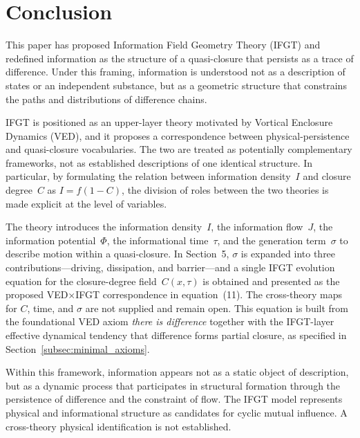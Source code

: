 
\section{Conclusion}
\label{sec:conclusion}

This paper has proposed Information Field Geometry Theory (IFGT) and redefined information as the
structure of a quasi-closure that persists as a trace of difference.
Under this framing, information is understood not as a description of states or an independent
substance, but as a geometric structure that constrains the paths and distributions of difference
chains.

IFGT is positioned as an upper-layer theory motivated by Vortical Enclosure
Dynamics (VED), and it proposes a correspondence between physical-persistence
and quasi-closure vocabularies.  The two are treated as potentially
complementary frameworks, not as established descriptions of one identical
structure.
In particular, by formulating the relation between information density~$I$ and closure degree~$C$
as $I = f(1-C)$, the division of roles between the two theories is made explicit at the level of
variables.

The theory introduces the information density~$I$, the information flow~$J$, the information
potential~$\Phi$, the informational time~$\tau$, and the generation term~$\sigma$ to describe
motion within a quasi-closure.
In Section~5, $\sigma$ is expanded into three contributions---driving, dissipation, and
barrier---and a single IFGT evolution equation for the closure-degree field~$C(x,\tau)$ is
obtained and presented as the proposed VED$\times$IFGT correspondence in equation~(11).
The cross-theory maps for $C$, time, and $\sigma$ are not supplied and remain open.
This equation is built from the foundational VED axiom \emph{there is difference}
together with the IFGT-layer effective dynamical tendency that difference forms
partial closure, as specified in Section~\ref{subsec:minimal_axioms}.

Within this framework, information appears not as a static object of description, but as a dynamic
process that participates in structural formation through the persistence of difference and the
constraint of flow.
The IFGT model represents physical and informational structure as candidates
for cyclic mutual influence.  A cross-theory physical identification is not
established.

